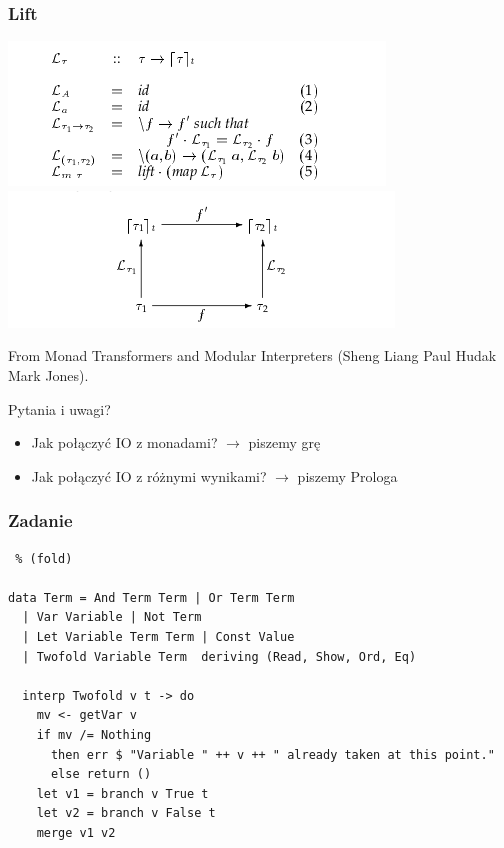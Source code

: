\documentclass{beamer}
\begin{document}
\begin{frame}[fragile] %
  \frametitle{Lift}
  \begin{center}
    \includegraphics[scale=0.6]{images/Constraint.png} \\
    \includegraphics[scale=0.6]{images/Graph.png}
  \end{center}
  {\tiny From Monad Transformers and Modular Interpreters (Sheng Liang
  Paul Hudak
Mark Jones).}
\end{frame}

\begin{frame} %
  \begin{center}
    {\huge Pytania i uwagi?}
    
    \begin{itemize}
      \item Jak połączyć IO z monadami? $\rightarrow$ piszemy grę
      \item Jak połączyć IO z różnymi wynikami? $\rightarrow$ piszemy Prologa
    \end{itemize}
  \end{center}
\end{frame}

\begin{frame}[fragile] %
  \frametitle{Zadanie}
  \begin{lstlisting} % (fold)

data Term = And Term Term | Or Term Term 
  | Var Variable | Not Term 
  | Let Variable Term Term | Const Value
  | Twofold Variable Term  deriving (Read, Show, Ord, Eq)

  interp Twofold v t -> do
    mv <- getVar v
    if mv /= Nothing
      then err $ "Variable " ++ v ++ " already taken at this point."
      else return ()
    let v1 = branch v True t
    let v2 = branch v False t
    merge v1 v2

  \end{lstlisting}
\end{frame}
\end{document}
